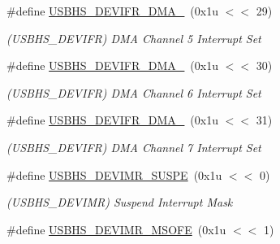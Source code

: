 \begin{DoxyCompactItemize}
\mbox{\label{group__SAME70__USBHS_ga763b06726988c3b3e4a011714464e47a}} 
\#define \mbox{\hyperlink{group__SAME70__USBHS_ga763b06726988c3b3e4a011714464e47a}{U\+S\+B\+H\+S\+\_\+\+D\+E\+V\+I\+F\+R\+\_\+\+D\+M\+A\+\_}}~(0x1u $<$$<$ 29)
\begin{DoxyCompactList}\small\item\em (U\+S\+B\+H\+S\+\_\+\+D\+E\+V\+I\+FR) D\+MA Channel 5 Interrupt Set \end{DoxyCompactList}\item 
\mbox{\label{group__SAME70__USBHS_gaf361f8016b9317bd2976526758f54895}} 
\#define \mbox{\hyperlink{group__SAME70__USBHS_gaf361f8016b9317bd2976526758f54895}{U\+S\+B\+H\+S\+\_\+\+D\+E\+V\+I\+F\+R\+\_\+\+D\+M\+A\+\_}}~(0x1u $<$$<$ 30)
\begin{DoxyCompactList}\small\item\em (U\+S\+B\+H\+S\+\_\+\+D\+E\+V\+I\+FR) D\+MA Channel 6 Interrupt Set \end{DoxyCompactList}\item 
\mbox{\label{group__SAME70__USBHS_ga8e33ec37429d0441a3d46125108d437d}} 
\#define \mbox{\hyperlink{group__SAME70__USBHS_ga8e33ec37429d0441a3d46125108d437d}{U\+S\+B\+H\+S\+\_\+\+D\+E\+V\+I\+F\+R\+\_\+\+D\+M\+A\+\_}}~(0x1u $<$$<$ 31)
\begin{DoxyCompactList}\small\item\em (U\+S\+B\+H\+S\+\_\+\+D\+E\+V\+I\+FR) D\+MA Channel 7 Interrupt Set \end{DoxyCompactList}\item 
\mbox{\label{group__SAME70__USBHS_ga6cad62f9cbcbb886e23b1afa808ae7a9}} 
\#define \mbox{\hyperlink{group__SAME70__USBHS_ga6cad62f9cbcbb886e23b1afa808ae7a9}{U\+S\+B\+H\+S\+\_\+\+D\+E\+V\+I\+M\+R\+\_\+\+S\+U\+S\+PE}}~(0x1u $<$$<$ 0)
\begin{DoxyCompactList}\small\item\em (U\+S\+B\+H\+S\+\_\+\+D\+E\+V\+I\+MR) Suspend Interrupt Mask \end{DoxyCompactList}\item 
\mbox{\label{group__SAME70__USBHS_ga9b635d3a0409b1e34b2a626b3e9a422c}} 
\#define \mbox{\hyperlink{group__SAME70__USBHS_ga9b635d3a0409b1e34b2a626b3e9a422c}{U\+S\+B\+H\+S\+\_\+\+D\+E\+V\+I\+M\+R\+\_\+\+M\+S\+O\+FE}}~(0x1u $<$$<$ 1)
$$
\end{DoxyCompactItemize}
